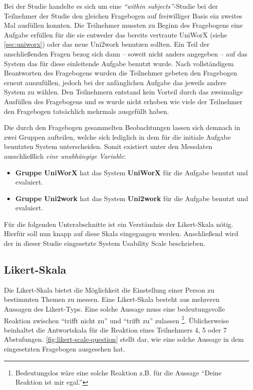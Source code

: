 \documentclass[11pt,a4paper,twoside,ngerman]{article}
\begin{document}
Bei der Studie handelte es sich um eine \emph{"`within subjects"'}-Studie bei der Teilnehmer der Studie den gleichen Fragebogen auf freiwilliger Basis ein zweites Mal ausfüllen konnten. Die Teilnehmer mussten zu Beginn des Fragebogens eine Aufgabe erfüllen für die sie entweder das bereits vertraute UniWorX (siehe \autoref{sec:uniworx}) oder das neue Uni2work benutzen sollten. Ein Teil der anschließenden Fragen bezog sich dann -- soweit nicht anders angegeben -- auf das System das für diese einleitende Aufgabe benutzt wurde. Nach vollständigem Beantworten des Fragebogens wurden die Teilnehmer gebeten den Fragebogen erneut auszufüllen, jedoch bei der anfänglichen Aufgabe das jeweils andere System zu wählen. Den Teilnehmern entstand kein Vorteil durch das zweimalige Ausfüllen des Fragebogens und es wurde nicht erhoben wie viele der Teilnehmer den Fragebogen tatsächlich mehrmals ausgefüllt haben.

Die durch den Fragebogen gesammelten Beobachtungen lassen sich demnach in zwei Gruppen aufteilen, welche sich lediglich in dem für die initiale Aufgabe benutzten System unterscheiden. Somit existiert unter den Messdaten ausschließlich \emph{eine unabhängige Variable}:

\begin{itemize}
    \item \textbf{Gruppe UniWorX} hat das System \textbf{UniWorX} für die Aufgabe benutzt und evaluiert.
    \item \textbf{Gruppe Uni2work} hat das System \textbf{Uni2work} für die Aufgabe benutzt und evaluiert.
\end{itemize}

\noindent
Für die folgenden Unterabschnitte ist ein Verständnis der Likert-Skala nötig. Hierfür soll nun knapp auf diese Skala eingegangen werden. Anschließend wird der in dieser Studie eingesetzte System Usability Scale beschrieben.

\subsection{Likert-Skala} \label{sec:likert}

Die Likert-Skala bietet die Möglichkeit die Einstellung einer Person zu bestimmten Themen zu messen. Eine Likert-Skala besteht aus mehreren Aussagen des Likert-Typs. Eine solche Aussage muss eine bedeutungsvolle Reaktion zwischen "`trifft nicht zu"' und "`trifft zu"' zulassen \footnote{Bedeutungslos wäre eine solche Reaktion z.B. für die Aussage "`Deine Reaktion ist mir egal."'}. Üblicherweise beinhaltet die Antwortskala für die Reaktion eines Teilnehmers 4, 5 oder 7 Abstufungen. \autoref{fig:likert-scale-question} stellt dar, wie eine solche Aussage in dem eingesetzten Fragebogen ausgesehen hat.
\end{document}
